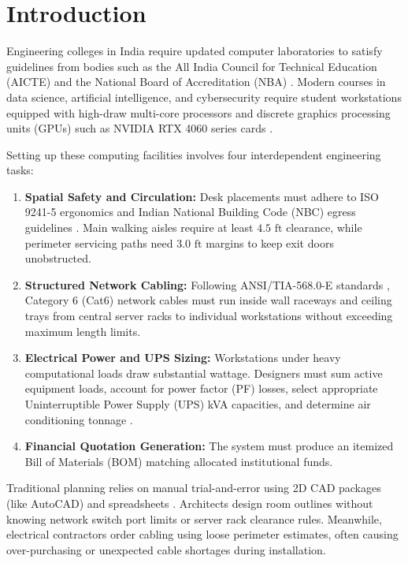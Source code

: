 \documentclass[conference]{IEEEtran}
\begin{document}
\section{Introduction}
Engineering colleges in India require updated computer laboratories to satisfy guidelines from bodies such as the All India Council for Technical Education (AICTE) and the National Board of Accreditation (NBA) \cite{ref_accreditation}. Modern courses in data science, artificial intelligence, and cybersecurity require student workstations equipped with high-draw multi-core processors and discrete graphics processing units (GPUs) such as NVIDIA RTX 4060 series cards \cite{ref_tia568}.

Setting up these computing facilities involves four interdependent engineering tasks:
\begin{enumerate}
    \item \textbf{Spatial Safety and Circulation:} Desk placements must adhere to ISO 9241-5 ergonomics and Indian National Building Code (NBC) egress guidelines \cite{ref_ergonomics, ref_osha}. Main walking aisles require at least $4.5\text{ ft}$ clearance, while perimeter servicing paths need $3.0\text{ ft}$ margins to keep exit doors unobstructed.
    \item \textbf{Structured Network Cabling:} Following ANSI/TIA-568.0-E standards \cite{ref_tia568}, Category 6 (Cat6) network cables must run inside wall raceways and ceiling trays from central server racks to individual workstations without exceeding maximum length limits.
    \item \textbf{Electrical Power and UPS Sizing:} Workstations under heavy computational loads draw substantial wattage. Designers must sum active equipment loads, account for power factor (PF) losses, select appropriate Uninterruptible Power Supply (UPS) kVA capacities, and determine air conditioning tonnage \cite{ref_ups_standard, ref_hvac_ashrae}.
    \item \textbf{Financial Quotation Generation:} The system must produce an itemized Bill of Materials (BOM) matching allocated institutional funds.
\end{enumerate}

Traditional planning relies on manual trial-and-error using 2D CAD packages (like AutoCAD) and spreadsheets \cite{ref_cad_review}. Architects design room outlines without knowing network switch port limits or server rack clearance rules. Meanwhile, electrical contractors order cabling using loose perimeter estimates, often causing over-purchasing or unexpected cable shortages during installation.
\end{document}
